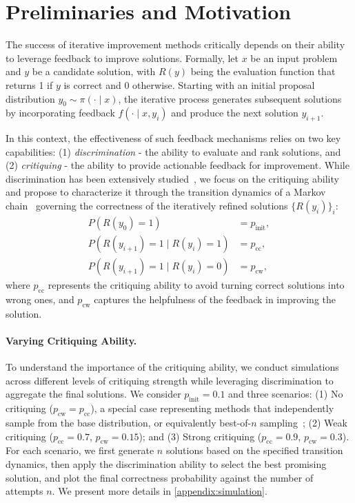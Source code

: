 \section{Preliminaries and Motivation}\label{sec:preliminary}
The success of iterative improvement methods critically depends on their ability to leverage feedback to improve solutions.
Formally, let $x$ be an input problem and $y$ be a candidate solution, with $R(y)$ being the evaluation function that returns 1 if $y$ is correct and 0 otherwise.
Starting with an initial proposal distribution $y_0 \sim \pi(\cdot \mid x)$, the iterative process generates subsequent solutions by incorporating feedback $f(\cdot \mid x, y_i)$ and produce the next solution $y_{i+1}$.

In this context, the effectiveness of such feedback mechanisms relies on two key capabilities: (1) \emph{discrimination} - the ability to evaluate and rank solutions, and (2) \emph{critiquing} - the ability to provide actionable feedback for improvement. While discrimination has been extensively studied~\cite{gao2023scaling}, we focus on the critiquing ability and propose to characterize it through the transition dynamics of a Markov chain~\cite{meyn2012markov} governing the correctness of the iteratively refined solutions $\{R(y_i)\}_i$:
\begin{equation*}
    \begin{aligned}
        P(R(y_0) = 1) &= p_{\mathrm{init}},\\
        P(R(y_{i+1}) = 1 \mid R(y_{i}) = 1) &= p_{\mathrm{cc}},\\
        P(R(y_{i+1}) = 1 \mid R(y_{i}) = 0) &= p_{\mathrm{cw}},
    \end{aligned}
\end{equation*}
where $p_{\mathrm{cc}}$ represents the critiquing ability to avoid turning correct solutions into wrong ones, and $p_{\mathrm{cw}}$ captures the helpfulness of the feedback in improving the solution.

\paragraph{Varying Critiquing Ability.}
To understand the importance of the critiquing ability, we conduct simulations across different levels of critiquing strength while leveraging discrimination to aggregate the final solutions. We consider $p_{\mathrm{init}} = 0.1$ and three scenarios:
(1) No critiquing ($p_{\mathrm{cw}} = p_{\mathrm{cc}}$), a special case representing methods that independently sample from the base distribution, or equivalently best-of-$n$ sampling~\cite{sessa2024bond};
(2) Weak critiquing ($p_{\mathrm{cc}} = 0.7$, $p_{\mathrm{cw}} = 0.15$); and
(3) Strong critiquing ($p_{\mathrm{cc}} = 0.9$, $p_{\mathrm{cw}} = 0.3$).
For each scenario, we first generate $n$ solutions based on the specified transition dynamics, then apply the discrimination ability to select the best promising solution, and plot the final correctness probability against the number of attempts $n$.
We present more details in \cref{appendix:simulation}.

